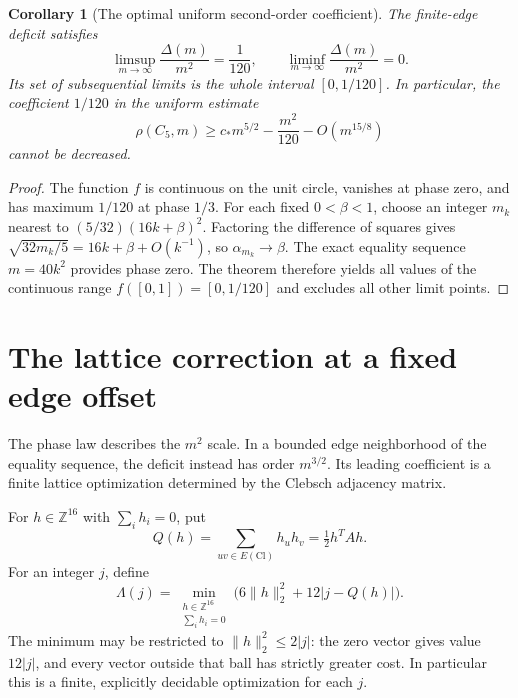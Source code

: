 \documentclass[11pt]{amsart}
\newtheorem{corollary}[theorem]{Corollary}
\theoremstyle{definition}
\theoremstyle{remark}
\begin{document}
\begin{corollary}[The optimal uniform second-order coefficient]
\label{cor:uniform-coefficient}
The finite-edge deficit satisfies
\[
 \limsup_{m\to\infty}\frac{\Delta(m)}{m^2}=\frac1{120},\qquad
 \liminf_{m\to\infty}\frac{\Delta(m)}{m^2}=0.
\]
Its set of subsequential limits is the whole interval $[0,1/120]$. In
particular, the coefficient $1/120$ in the uniform estimate
\[
 \rho(C_5,m)\geq c_\ast m^{5/2}-\frac{m^2}{120}-O(m^{15/8})
\]
cannot be decreased.
\end{corollary}
\begin{proof}
The function $f$ is continuous on the unit circle, vanishes at phase zero,
and has maximum $1/120$ at phase $1/3$. For each fixed $0<\beta<1$,
choose an integer $m_k$ nearest to $(5/32)(16k+\beta)^2$. Factoring the
difference of squares gives
$\sqrt{32m_k/5}=16k+\beta+O(k^{-1})$, so $\alpha_{m_k}\to\beta$.
The exact equality sequence $m=40k^2$ provides phase zero. The theorem
therefore yields all values of the continuous range
$f([0,1])=[0,1/120]$ and excludes all other limit points.
\end{proof}

\section{The lattice correction at a fixed edge offset}
\label{sec:lattice-offset}

The phase law describes the $m^2$ scale. In a bounded edge neighborhood
of the equality sequence, the deficit instead has order $m^{3/2}$. Its
leading coefficient is a finite lattice optimization determined by the
Clebsch adjacency matrix.

For $h\in\mathbb Z^{16}$ with $\sum_i h_i=0$, put
\[
 Q(h)=\sum_{uv\in E(\mathrm{Cl})}h_uh_v=\tfrac12h^TAh.
\]
For an integer $j$, define
\begin{equation}\tag{68}\label{eq:lattice-objective}
 \Lambda(j)=\min_{\substack{h\in\mathbb Z^{16}\\\sum_i h_i=0}}
 \bigl(6\lVert h\rVert_2^2+12|j-Q(h)|\bigr).
\end{equation}
The minimum may be restricted to $\lVert h\rVert_2^2\leq2|j|$: the zero
vector gives value $12|j|$, and every vector outside that ball has
strictly greater cost. In particular this is a finite, explicitly
decidable optimization for each $j$.
\end{document}
